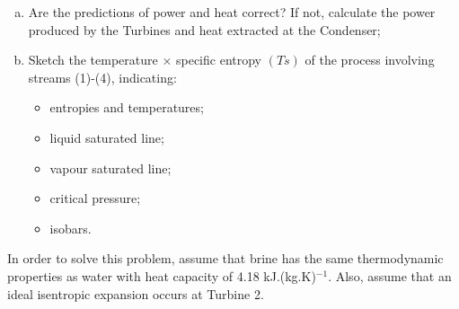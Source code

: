 \documentclass[calculator,allquestions,datasheet,solutions]{exam_newMarcus2}
\begin{document}
\begin{question}
\begin{enumerate}[a)]
{\begin{enumerate}[1)]
            \end{enumerate}
         }
     \item Are the predictions of power and heat correct? If not, calculate the power produced by the Turbines and heat extracted at the Condenser;~
     \item Sketch the temperature $\times$ specific entropy $\left(Ts\right)$ of the process involving streams (1)-(4), indicating:~
       \begin{itemize}
          \item entropies and temperatures;
          \item liquid saturated line;
          \item vapour saturated line;
          \item critical pressure;
          \item isobars.
       \end{itemize}  
  \end{enumerate}
  In order to solve this problem, assume that brine has the same thermodynamic properties as water with heat capacity of 4.18 kJ.(kg.K)$^{-1}$. Also, assume that an ideal isentropic expansion occurs at Turbine 2.
\end{question}

\clearpage

\vfill
\paperend
 


\vfill 



{
  
}
\end{document}
